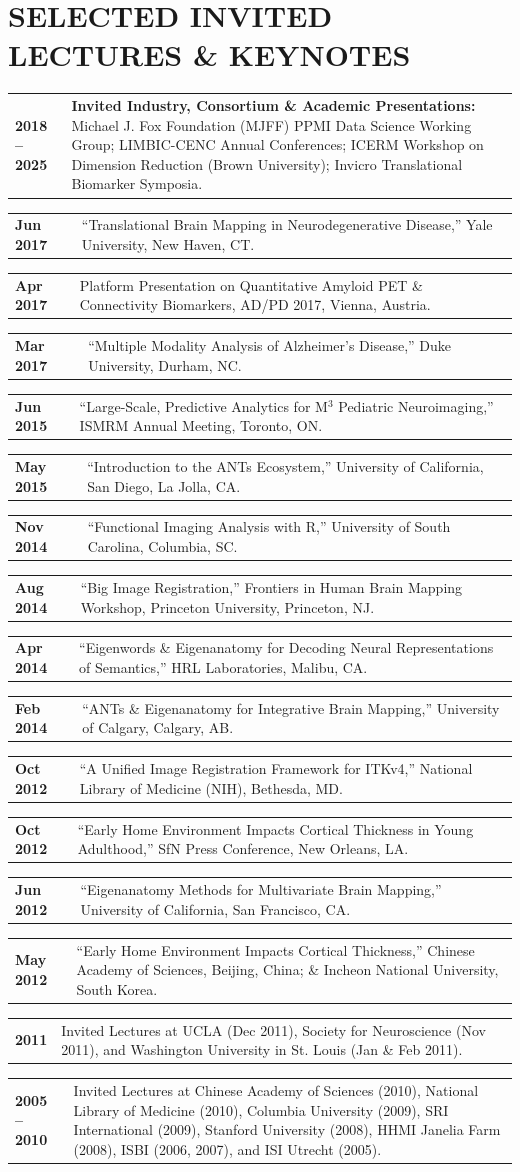 \documentclass[10pt,letterpaper]{article}
\makeatletter
\newcommand{\cvline}[2]{%
  \noindent\begin{tabularx}{\textwidth}{@{} >{\raggedright\arraybackslash\bfseries\footnotesize\color{accent}}p{1.15in} >{\footnotesize\arraybackslash}X @{}}
    #1 & #2
  \end{tabularx}\par\vspace{2pt}%
}
\makeatother
\begin{document}
\section{SELECTED INVITED LECTURES \& KEYNOTES}
\cvline{2018 -- 2025}{\textbf{Invited Industry, Consortium \& Academic Presentations:} Michael J. Fox Foundation (MJFF) PPMI Data Science Working Group; LIMBIC-CENC Annual Conferences; ICERM Workshop on Dimension Reduction (Brown University); Invicro Translational Biomarker Symposia.}
\cvline{Jun 2017}{``Translational Brain Mapping in Neurodegenerative Disease,'' Yale University, New Haven, CT.}
\cvline{Apr 2017}{Platform Presentation on Quantitative Amyloid PET \& Connectivity Biomarkers, AD/PD 2017, Vienna, Austria.}
\cvline{Mar 2017}{``Multiple Modality Analysis of Alzheimer's Disease,'' Duke University, Durham, NC.}
\cvline{Jun 2015}{``Large-Scale, Predictive Analytics for M$^3$ Pediatric Neuroimaging,'' ISMRM Annual Meeting, Toronto, ON.}
\cvline{May 2015}{``Introduction to the ANTs Ecosystem,'' University of California, San Diego, La Jolla, CA.}
\cvline{Nov 2014}{``Functional Imaging Analysis with R,'' University of South Carolina, Columbia, SC.}
\cvline{Aug 2014}{``Big Image Registration,'' Frontiers in Human Brain Mapping Workshop, Princeton University, Princeton, NJ.}
\cvline{Apr 2014}{``Eigenwords \& Eigenanatomy for Decoding Neural Representations of Semantics,'' HRL Laboratories, Malibu, CA.}
\cvline{Feb 2014}{``ANTs \& Eigenanatomy for Integrative Brain Mapping,'' University of Calgary, Calgary, AB.}
\cvline{Oct 2012}{``A Unified Image Registration Framework for ITKv4,'' National Library of Medicine (NIH), Bethesda, MD.}
\cvline{Oct 2012}{``Early Home Environment Impacts Cortical Thickness in Young Adulthood,'' SfN Press Conference, New Orleans, LA.}
\cvline{Jun 2012}{``Eigenanatomy Methods for Multivariate Brain Mapping,'' University of California, San Francisco, CA.}
\cvline{May 2012}{``Early Home Environment Impacts Cortical Thickness,'' Chinese Academy of Sciences, Beijing, China; \& Incheon National University, South Korea.}
\cvline{2011}{Invited Lectures at UCLA (Dec 2011), Society for Neuroscience (Nov 2011), and Washington University in St. Louis (Jan \& Feb 2011).}
\cvline{2005 -- 2010}{Invited Lectures at Chinese Academy of Sciences (2010), National Library of Medicine (2010), Columbia University (2009), SRI International (2009), Stanford University (2008), HHMI Janelia Farm (2008), ISBI (2006, 2007), and ISI Utrecht (2005).}

\end{document}
